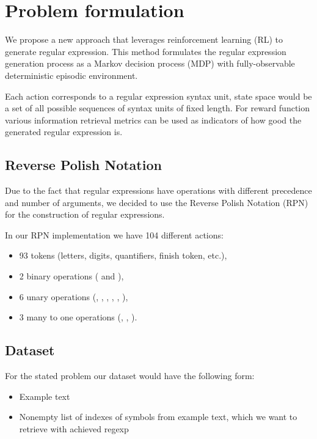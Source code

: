 \documentclass{article}
\begin{document}
\section{Problem formulation}

We propose a new approach that leverages reinforcement learning (RL) to generate regular expression.
This method formulates the regular expression generation process as a Markov decision process (MDP)
with fully-observable deterministic episodic environment.

Each action corresponds to a regular expression syntax unit, state space would be a set of all possible sequences
of syntax units of fixed length. For reward function various information retrieval metrics can be used as indicators
of how good the generated regular expression is.

\subsection{Reverse Polish Notation}
Due to the fact that regular expressions have operations with different precedence and number of arguments,
we decided to use the Reverse Polish Notation (RPN) for the construction of regular expressions.

In our RPN implementation we have 104 different actions:
\begin{itemize}
  \item 93 tokens (letters, digits, quantifiers, finish token, etc.),
  \item 2 binary operations ( and \codeword{|}),
  \item 6 unary operations (\codeword{*}, \codeword{+}, , , , ),
  \item 3 many to one operations (\codeword{[]}, \codeword{^[]}, ).
\end{itemize}

\subsection{Dataset}

For the stated problem our dataset would have the following form:
\begin{itemize}
  \item Example text
  \item Nonempty list of indexes of symbols from example text, which we want to retrieve with achieved regexp
\end{itemize}
\end{document}
